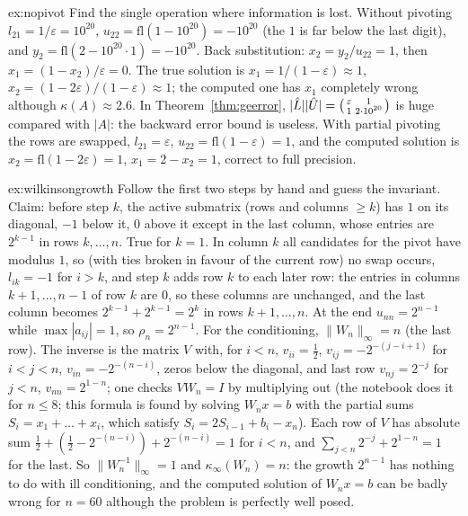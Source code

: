 \begin{solution}{ex:nopivot}
\idea Find the single operation where information is lost.
\writeup Without pivoting $l_{21}=1/\varepsilon=10^{20}$, $u_{22}=\mathrm{fl}(1-10^{20})=-10^{20}$ (the $1$ is far below the last digit), and
$y_2=\mathrm{fl}(2-10^{20}\cdot1)=-10^{20}$. Back substitution: $x_2=y_2/u_{22}=1$, then $x_1=(1-x_2)/\varepsilon=0$. The true solution is
$x_1=1/(1-\varepsilon)\approx1$, $x_2=(1-2\varepsilon)/(1-\varepsilon)\approx1$; the computed one has $x_1$ completely wrong although $\kappa(A)\approx2.6$. In
Theorem~\ref{thm:geerror}, $|\hat L||\hat U|=\begin{psmallmatrix}\varepsilon&1\\1&2\cdot10^{20}\end{psmallmatrix}$ is huge compared with $|A|$: the backward
error bound is useless. With partial pivoting the rows are swapped, $l_{21}=\varepsilon$, $u_{22}=\mathrm{fl}(1-\varepsilon)=1$, and the computed solution is
$x_2=\mathrm{fl}(1-2\varepsilon)=1$, $x_1=2-x_2=1$, correct to full precision.
\end{solution}

\begin{solution}{ex:wilkinsongrowth}
\idea Follow the first two steps by hand and guess the invariant.
\writeup Claim: before step $k$, the active submatrix (rows and columns $\ge k$) has $1$ on its diagonal, $-1$ below it, $0$ above it except in the last column,
whose entries are $2^{k-1}$ in rows $k,\dots,n$. True for $k=1$. In column $k$ all candidates for the pivot have modulus $1$, so (with ties broken in favour
of the current row) no swap occurs, $l_{ik}=-1$ for $i>k$, and step $k$ adds row $k$ to each later row: the entries in columns $k+1,\dots,n-1$ of row $k$ are $0$,
so these columns are unchanged, and the last column becomes $2^{k-1}+2^{k-1}=2^k$ in rows $k+1,\dots,n$. At the end $u_{nn}=2^{n-1}$ while $\max|a_{ij}|=1$, so
$\rho_n=2^{n-1}$. For the conditioning, $\|W_n\|_\infty=n$ (the last row). The inverse is the matrix $V$ with, for $i<n$, $v_{ii}=\frac12$,
$v_{ij}=-2^{-(j-i+1)}$ for $i<j<n$, $v_{in}=-2^{-(n-i)}$, zeros below the diagonal, and last row $v_{nj}=2^{-j}$ for $j<n$, $v_{nn}=2^{1-n}$; one checks $VW_n=I$ by
multiplying out (the notebook does it for $n\le8$; this formula is found by solving $W_nx=b$ with the partial sums $S_i=x_1+\dots+x_i$, which satisfy
$S_i=2S_{i-1}+b_i-x_n$). Each row of $V$ has absolute sum $\frac12+(\frac12-2^{-(n-i)})+2^{-(n-i)}=1$ for $i<n$, and $\sum_{j<n}2^{-j}+2^{1-n}=1$ for the last.
So $\|W_n^{-1}\|_\infty=1$ and $\kappa_\infty(W_n)=n$: the growth $2^{n-1}$ has nothing to do with ill conditioning, and the computed solution of $W_nx=b$ can
be badly wrong for $n=60$ although the problem is perfectly well posed.
\end{solution}


